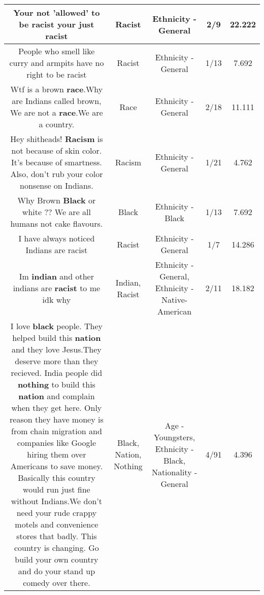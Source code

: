\documentclass[11pt]{article}
\newlength\mylength
\begin{document}
\begin{center}
\begin{longtable}{|C{.65\mylength}|C{.30\mylength}|C{.12\mylength}|C{.12\mylength}|C{.12\mylength}|}
  \small Your not 'allowed' to be \textbf{racist} your just racist\normalsize   & Racist & Ethnicity - General & 2/9 & 22.222 \\  \hline
  \small People who smell like curry and armpits have no right to be racist\normalsize   & Racist & Ethnicity - General & 1/13 & 7.692 \\  \hline
  \small Wtf is a brown \textbf{race}.Why are Indians called brown, We are not a \textbf{race}.We are a country.\normalsize   & Race & Ethnicity - General & 2/18 & 11.111 \\  \hline
  \small Hey shitheads! \textbf{Racism} is not because of skin color. It's because of smartness. Also, don't rub your color nonsense on Indians.\normalsize   & Racism & Ethnicity - General & 1/21 & 4.762 \\  \hline
  \small Why Brown \textbf{Black} or white ?? We are all humans  not  cake  flavours.\normalsize   & Black & Ethnicity - Black & 1/13 & 7.692 \\  \hline
  \small I have always noticed Indians are racist\normalsize   & Racist & Ethnicity - General & 1/7 & 14.286 \\  \hline
  \small Im \textbf{indian} and other indians are \textbf{racist} to me idk why\normalsize   & Indian, Racist & Ethnicity - General, Ethnicity - Native-American & 2/11 & 18.182 \\  \hline
  \small I love \textbf{black} people. They helped build this \textbf{nation} and they love Jesus.They deserve more than they recieved. India people did \textbf{nothing} to build this \textbf{nation} and complain when they get here. Only reason they have money is from chain migration and companies like Google hiring them over Americans to save money. Basically this country would run just fine without Indians.We don't need your rude crappy motels and convenience stores that badly. This country is changing. Go build your own country and do your stand up comedy over there.\normalsize   & Black, Nation, Nothing & Age - Youngsters, Ethnicity - Black, Nationality - General & 4/91 & 4.396 \\  \hline

\end{longtable}
\end{center}
\end{document}
